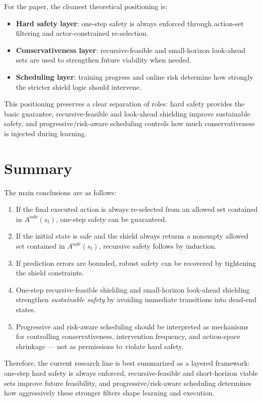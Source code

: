 \documentclass[11pt]{article}
\begin{document}
For the paper, the cleanest theoretical positioning is:
\begin{itemize}[leftmargin=1.5em]
    \item \textbf{Hard safety layer}: one-step safety is always enforced through action-set filtering and actor-constrained re-selection.
    \item \textbf{Conservativeness layer}: recursive-feasible and small-horizon look-ahead sets are used to strengthen future viability when needed.
    \item \textbf{Scheduling layer}: training progress and online risk determine how strongly the stricter shield logic should intervene.
\end{itemize}

This positioning preserves a clear separation of roles: hard safety provides the basic guarantee, recursive-feasible and look-ahead shielding improve sustainable safety, and progressive/risk-aware scheduling controls how much conservativeness is injected during learning.

\section{Summary}

The main conclusions are as follows:
\begin{enumerate}[label=(\arabic*),leftmargin=1.8em]
    \item If the final executed action is always re-selected from an allowed set contained in $A^{\mathrm{safe}}(s_t)$, one-step safety can be guaranteed.
    \item If the initial state is safe and the shield always returns a nonempty allowed set contained in $A^{\mathrm{safe}}(s_t)$, recursive safety follows by induction.
    \item If prediction errors are bounded, robust safety can be recovered by tightening the shield constraints.
    \item One-step recursive-feasible shielding and small-horizon look-ahead shielding strengthen \emph{sustainable safety} by avoiding immediate transitions into dead-end states.
    \item Progressive and risk-aware scheduling should be interpreted as mechanisms for controlling conservativeness, intervention frequency, and action-space shrinkage --- not as permissions to violate hard safety.
\end{enumerate}

Therefore, the current research line is best summarized as a layered framework: one-step hard safety is always enforced, recursive-feasible and short-horizon viable sets improve future feasibility, and progressive/risk-aware scheduling determines how aggressively these stronger filters shape learning and execution.
\end{document}

